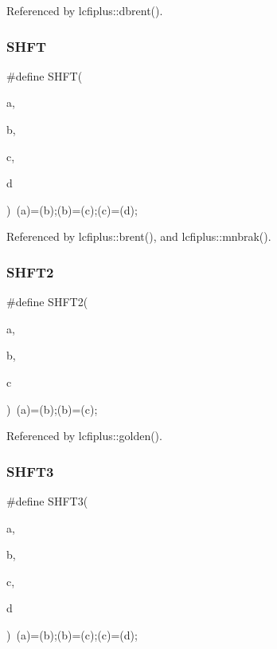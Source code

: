 Referenced by lcfiplus\+::dbrent().

\mbox{\label{algo_8h_a199afb41152cc9a1c32d60f129a40ea5}} 
\subsubsection{S\+H\+FT}
{\footnotesize\ttfamily \#define S\+H\+FT(\begin{DoxyParamCaption}\item[{}]{a,  }\item[{}]{b,  }\item[{}]{c,  }\item[{}]{d }\end{DoxyParamCaption})~(a)=(b);(b)=(c);(c)=(d);}



Referenced by lcfiplus\+::brent(), and lcfiplus\+::mnbrak().

\mbox{\label{algo_8h_a4a68f16b0ff909c9a2db33ed91c173f3}} 
\subsubsection{S\+H\+F\+T2}
{\footnotesize\ttfamily \#define S\+H\+F\+T2(\begin{DoxyParamCaption}\item[{}]{a,  }\item[{}]{b,  }\item[{}]{c }\end{DoxyParamCaption})~(a)=(b);(b)=(c);}



Referenced by lcfiplus\+::golden().

\mbox{\label{algo_8h_aa2fe0a6eb610d7d50048c62747994d4a}} 
\subsubsection{S\+H\+F\+T3}
{\footnotesize\ttfamily \#define S\+H\+F\+T3(\begin{DoxyParamCaption}\item[{}]{a,  }\item[{}]{b,  }\item[{}]{c,  }\item[{}]{d }\end{DoxyParamCaption})~(a)=(b);(b)=(c);(c)=(d);}



